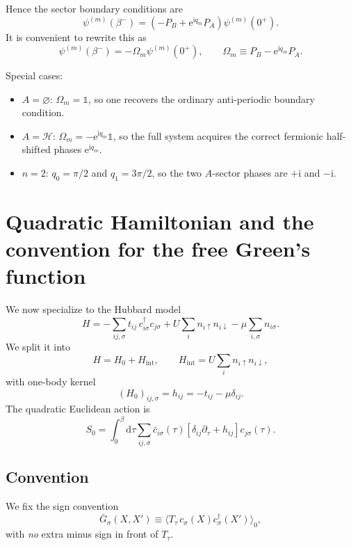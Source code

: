 \documentclass[11pt]{article}
\newcommand{\e}{\mathrm{e}}
\newcommand{\ii}{\mathrm{i}}
\newcommand{\dd}{\mathrm{d}}
\newcommand{\1}{\mathds{1}}
\newcommand{\HH}{\mathcal{H}}
\newcommand{\up}{\uparrow}
\newcommand{\dn}{\downarrow}
\newcommand{\br}[1]{\left(#1\right)}
\newcommand{\sq}[1]{\left[#1\right]}
\begin{document}
Hence the sector boundary conditions are
\begin{equation}
\psi^{(m)}(\beta^-)
=
\br{
-P_B
+
\e^{\ii q_m}P_A
}\psi^{(m)}(0^+).
\label{eq:sector-bc-graded-direct}
\end{equation}
It is convenient to rewrite this as
\begin{equation}
\psi^{(m)}(\beta^-)
=
-\Omega_m \psi^{(m)}(0^+),
\qquad
\Omega_m\equiv P_B-\e^{\ii q_m}P_A.
\label{eq:Omega-def}
\end{equation}

Special cases:
\begin{itemize}[leftmargin=2em]
\item $A=\varnothing$: $\Omega_m=\1$, so one recovers the ordinary
anti-periodic boundary condition.
\item $A=\HH$: $\Omega_m=-\e^{\ii q_m}\1$, so the full system acquires the
correct fermionic half-shifted phases $\e^{\ii q_m}$.
\item $n=2$: $q_0=\pi/2$ and $q_1=3\pi/2$, so the two $A$-sector phases are
$+\ii$ and $-\ii$.
\end{itemize}

\section{Quadratic Hamiltonian and the convention for the free Green's function}

We now specialize to the Hubbard model
\begin{equation}
H
=
-\sum_{ij,\sigma} t_{ij}\, c_{i\sigma}^\dagger c_{j\sigma}
+
U\sum_i n_{i\up}n_{i\dn}
-
\mu \sum_{i,\sigma} n_{i\sigma}.
\label{eq:Hubbard-H}
\end{equation}
We split it into
\begin{equation}
H=H_0+H_{\mathrm{int}},
\qquad
H_{\mathrm{int}}=U\sum_i n_{i\up}n_{i\dn},
\label{eq:H-split}
\end{equation}
with one-body kernel
\begin{equation}
(H_0)_{ij,\sigma}=h_{ij}=-t_{ij}-\mu\delta_{ij}.
\label{eq:h-def}
\end{equation}
The quadratic Euclidean action is
\begin{equation}
S_0
=
\int_0^\beta \dd\tau \sum_{ij,\sigma}
\bar c_{i\sigma}(\tau)\sq{\delta_{ij}\partial_\tau + h_{ij}}c_{j\sigma}(\tau).
\label{eq:S0}
\end{equation}

\subsection*{Convention}
We fix the sign convention
\begin{equation}
\boxed{
\bar G_\sigma(X,X')
\equiv
\langle T_\tau\, c_\sigma(X)c_\sigma^\dagger(X')\rangle_0,
}
\label{eq:Gbar-def-single}
\end{equation}
with \emph{no} extra minus sign in front of $T_\tau$.
\end{document}
